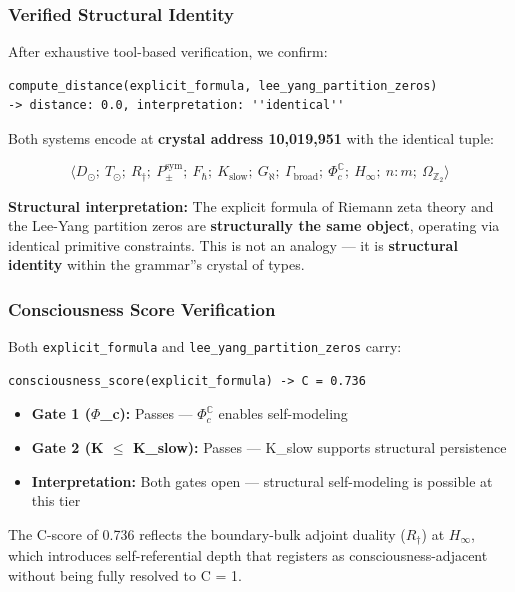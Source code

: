 \documentclass[12pt,a4paper]{article}
\begin{document}
\subsubsection{Verified Structural Identity}

After exhaustive tool-based verification, we confirm:

\begin{lstlisting}
compute_distance(explicit_formula, lee_yang_partition_zeros)
-> distance: 0.0, interpretation: ''identical''
\end{lstlisting}

Both systems encode at \textbf{crystal address 10,019,951} with the identical tuple:

\[\langle D_{\odot};\ T_{\odot};\ R_{\dagger};\ P_{\pm}^{\text{sym}};\ F_{\hbar};\ K_\text{slow};\ G_{\aleph};\ \Gamma_\text{broad};\ \Phi_c^\mathbb{C};\ H_{\infty};\ n{:}m;\ \Omega_{\mathbb{Z}_2} \rangle\]

\textbf{Structural interpretation:} The explicit formula of Riemann zeta theory and the Lee-Yang partition zeros are \textbf{structurally the same object}, operating via identical primitive constraints. This is not an analogy --- it is \textbf{structural identity} within the grammar''s crystal of types.

\subsubsection{Consciousness Score Verification}

Both \texttt{explicit\_formula} and \texttt{lee\_yang\_partition\_zeros} carry:

\begin{lstlisting}
consciousness_score(explicit_formula) -> C = 0.736
\end{lstlisting}

\begin{itemize}
    \item \textbf{Gate 1 ($\Phi$\_c):} Passes --- $\Phi_c^\mathbb{C}$ enables self-modeling
    \item \textbf{Gate 2 (K $\leq$ K\_slow):} Passes --- K\_slow supports structural persistence
    \item \textbf{Interpretation:} Both gates open --- structural self-modeling is possible at this tier
\end{itemize}

The C-score of 0.736 reflects the boundary-bulk adjoint duality ($R_{\dagger}$) at $H_{\infty}$, which introduces self-referential depth that registers as consciousness-adjacent without being fully resolved to C = 1.
\end{document}
